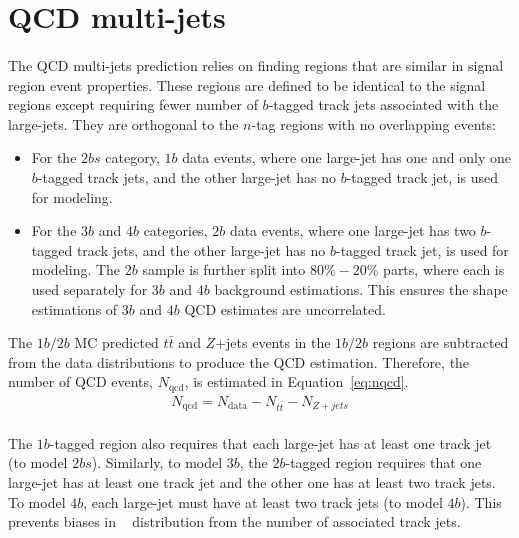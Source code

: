 \section{QCD multi-jets}
\label{sec:boosted-qcd}

\paragraph{}
The QCD multi-jets prediction relies on finding regions that are similar in signal region event properties.
These regions are defined to be identical to the signal regions except requiring fewer number of $b$-tagged track jets associated with the large-\R jets.
They are orthogonal to the $n$-tag regions with no overlapping events:
\begin{itemize}
\item For the $2bs$ category, $1b$ data events, where one large-\R jet has one and only one $b$-tagged track jets, and the other large-\R jet has no $b$-tagged track jet, is used for modeling.
\item For the $3b$ and $4b$ categories, $2b$ data events, where one large-\R jet has two $b$-tagged track jets, and the other large-\R jet has no $b$-tagged track jet, is used for modeling. The $2b$ sample is further split into $80\%-20\%$ parts, where each is used separately for $3b$ and $4b$ background estimations. This ensures the shape estimations of $3b$ and $4b$ QCD estimates are uncorrelated. 
\end{itemize}
The $1b/2b$ MC predicted $t\bar{t}$ and $Z$+jets events in the $1b/2b$ regions are subtracted from the data distributions to produce the QCD estimation. 
Therefore, the number of QCD events, $N_{\text{qcd}}$, is estimated in Equation~\ref{eq:nqcd}.
\begin{eqnarray}
\label{eq:nqcd}
N_{\text{qcd}} = N_{\text{data}} - N_{t\bar{t}} - N_{Z+jets} 
\end{eqnarray}

\paragraph{}
The $1b$-tagged region also requires that each large-\R jet has at least one track jet (to model $2bs$).
Similarly, to model $3b$, the $2b$-tagged region requires that one large-\R jet has at least one track jet and the other one has at least two track jets. 
To model $4b$, each large-\R jet must have at least two track jets (to model $4b$).
This prevents biases in \mtwoJ~ distribution from the number of associated track jets.

